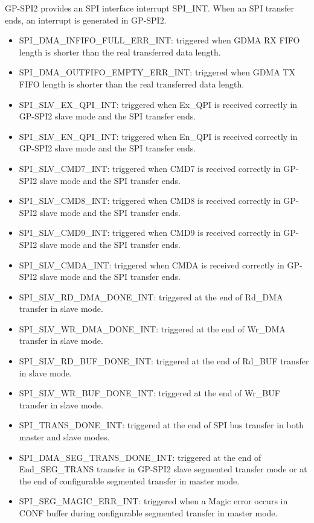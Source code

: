 \documentclass[main\_\_EN.tex]{subfiles}
\begin{document}
GP-SPI2 provides an SPI interface interrupt SPI\_INT. When an SPI transfer ends, an interrupt is generated in GP-SPI2.

\begin{itemize}
\item \label{int:SPIINFIFOFULLERRINT}SPI\_DMA\_INFIFO\_FULL\_ERR\_INT: triggered when GDMA RX FIFO length is shorter than the real transferred data length.
\item \label{int:SPIOUTFIFOEMPTYERRINT}SPI\_DMA\_OUTFIFO\_EMPTY\_ERR\_INT: triggered when GDMA TX FIFO length is shorter than the real transferred data length.

\item \label{int:SPISLVEXQPIINT} SPI\_SLV\_EX\_QPI\_INT: triggered when Ex\_QPI is received correctly in GP-SPI2 slave mode and the SPI transfer ends.
\item \label{int:SPISLVENQPIINT} SPI\_SLV\_EN\_QPI\_INT: triggered when En\_QPI is received correctly in GP-SPI2 slave mode and the SPI transfer ends.
\item \label{int:SPISLVCMD7INT} SPI\_SLV\_CMD7\_INT: triggered when CMD7 is received correctly in GP-SPI2 slave mode and the SPI transfer ends.
\item \label{int:SPISLVCMD8INT} SPI\_SLV\_CMD8\_INT: triggered when CMD8 is received correctly in GP-SPI2 slave mode and the SPI transfer ends.
\item \label{int:SPISLVCMD9INT} SPI\_SLV\_CMD9\_INT: triggered when CMD9 is received correctly in GP-SPI2 slave mode and the SPI transfer ends.
\item \label{int:SPISLVCMDAINT} SPI\_SLV\_CMDA\_INT: triggered when CMDA is received correctly in GP-SPI2 slave mode and the SPI transfer ends.

\item \label{int:SPISLVRDDMADONEINT}SPI\_SLV\_RD\_DMA\_DONE\_INT: triggered at the end of Rd\_DMA transfer in slave mode.
\item \label{int:SPISLVWRDMADONEINT}SPI\_SLV\_WR\_DMA\_DONE\_INT: triggered at the end of Wr\_DMA transfer in slave mode.
\item \label{int:SPISLVRDBUFDONEINT}SPI\_SLV\_RD\_BUF\_DONE\_INT: triggered at the end of Rd\_BUF transfer in slave mode.
\item \label{int:SPISLVWRBUFDONEINT}SPI\_SLV\_WR\_BUF\_DONE\_INT: triggered at the end of Wr\_BUF transfer in slave mode.

\item \label{int:SPITRANSDONEINT}SPI\_TRANS\_DONE\_INT: triggered at the end of SPI bus transfer in both master and slave modes.
\item \label{int:SPIDMASEGTRANSDONEINT}SPI\_DMA\_SEG\_TRANS\_DONE\_INT: triggered at the end of End\_SEG\_TRANS transfer in GP-SPI2 slave segmented transfer mode or at the end of configurable segmented transfer in master mode.
\item \label{int:SPISEGMAGICERRINT} SPI\_SEG\_MAGIC\_ERR\_INT: triggered when a Magic error occurs in CONF buffer during configurable segmented transfer in master mode.



\end{itemize}
\end{document}

